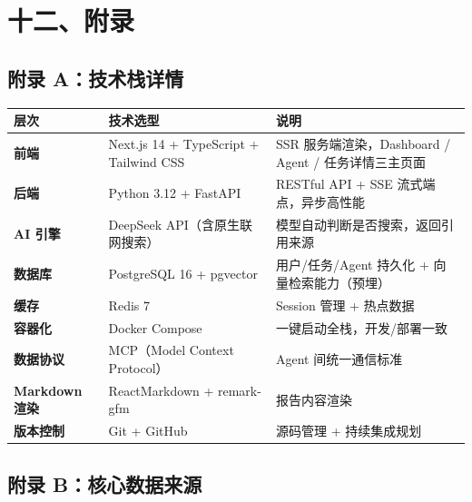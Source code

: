 \documentclass[
]{ctexart}
\begin{document}
\section{十二、附录}\label{ux5341ux4e8cux9644ux5f55}

\subsection{附录
A：技术栈详情}\label{ux9644ux5f55-aux6280ux672fux6808ux8be6ux60c5}

\begin{longtable}[]{@{}
  >{\raggedright\arraybackslash}p{}
  >{\raggedright\arraybackslash}p{}
  >{\raggedright\arraybackslash}p{}@{}}
\toprule\noalign{}
\begin{minipage}[b]{\linewidth}\raggedright
层次
\end{minipage} & \begin{minipage}[b]{\linewidth}\raggedright
技术选型
\end{minipage} & \begin{minipage}[b]{\linewidth}\raggedright
说明
\end{minipage} \\
\midrule\noalign{}
\endhead
\bottomrule\noalign{}
\endlastfoot
\textbf{前端} & Next.js 14 + TypeScript + Tailwind CSS & SSR
服务端渲染，Dashboard / Agent / 任务详情三主页面 \\
\textbf{后端} & Python 3.12 + FastAPI & RESTful API + SSE
流式端点，异步高性能 \\
\textbf{AI 引擎} & DeepSeek API（含原生联网搜索） &
模型自动判断是否搜索，返回引用来源 \\
\textbf{数据库} & PostgreSQL 16 + pgvector & 用户/任务/Agent 持久化 +
向量检索能力（预埋） \\
\textbf{缓存} & Redis 7 & Session 管理 + 热点数据 \\
\textbf{容器化} & Docker Compose & 一键启动全栈，开发/部署一致 \\
\textbf{数据协议} & MCP（Model Context Protocol） & Agent
间统一通信标准 \\
\textbf{Markdown 渲染} & ReactMarkdown + remark-gfm & 报告内容渲染 \\
\textbf{版本控制} & Git + GitHub & 源码管理 + 持续集成规划 \\
\end{longtable}


\subsection{附录
B：核心数据来源}\label{ux9644ux5f55-bux6838ux5fc3ux6570ux636eux6765ux6e90}
\end{document}
